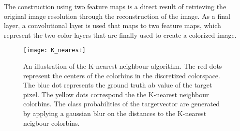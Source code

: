 The construction using two feature maps is a direct result of retrieving the original image resolution through the reconstruction of the image. As a final layer, a convolutional layer is used that maps to two feature maps, which represent the two color layers that are finally used to create a colorized image.

\begin{wrapfigure}{R}{0.5\textwidth}
	\vspace{-20pt}
	\begin{center}
		\texttt{[image: K\_nearest]}
	\end{center}
	\caption{An illustration of the K-nearest neighbour algorithm. The red dots represent the centers of the colorbins in the discretized colorspace. The blue dot represents the ground truth ab value of the target pixel. The yellow dots correspond the the K-nearest neighbour colorbins. The class probabilities of the targetvector are generated by applying a gaussian blur on the distances to the K-nearest neigbour colorbins.}
	\vspace{-10pt}
	\label{fig:k_nearest}
\end{wrapfigure}

